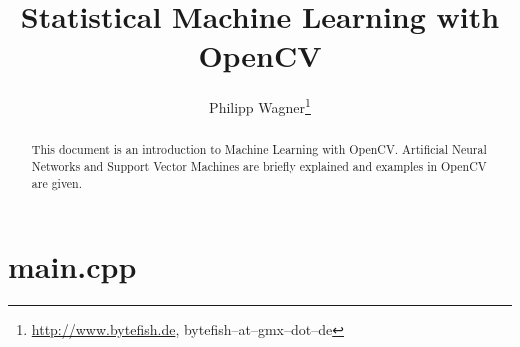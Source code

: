 \documentclass[10pt]{scrartcl}
\author{Philipp Wagner\thanks{\url{http://www.bytefish.de}, bytefish--at--gmx--dot--de}}
\title{Statistical Machine Learning with OpenCV}
\begin{document}
\maketitle

\begin{abstract}
This document is an introduction to Machine Learning with OpenCV. Artificial Neural Networks and Support Vector Machines are briefly explained and examples in OpenCV are given.
\end{abstract}








\appendix

\section{main.cpp}




\end{document}
